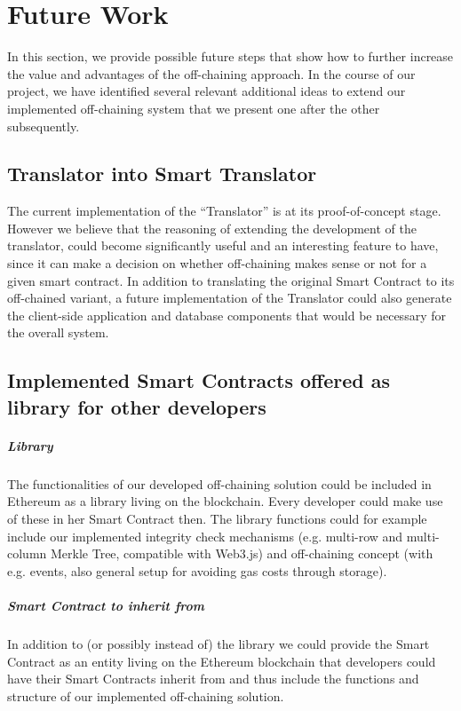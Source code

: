 \section{Future Work} \label{sec:future_work}

In this section, we provide possible future steps that show how to further increase the value and advantages of the off-chaining approach. In the course of our project, we have identified several relevant additional ideas to extend our implemented off-chaining system that we present one after the other subsequently.

\subsection{Translator into Smart Translator}
The current implementation of the “Translator” is at its proof-of-concept stage. However we believe that the reasoning of extending the development of the translator, could become significantly useful and an interesting feature to have, since it can make a decision on whether off-chaining makes sense or not for a given smart contract. In addition to translating the original Smart Contract to its off-chained variant, a future implementation of the Translator could also generate the client-side application and database components that would be necessary for the overall system.

\subsection{Implemented Smart Contracts offered as library for other developers}
\subparagraph{Library}
The functionalities of our developed off-chaining solution could be included in Ethereum as a library living on the blockchain. Every developer could make use of these in her Smart Contract then. The library functions could for example include our implemented integrity check mechanisms (e.g. multi-row and multi-column Merkle Tree, compatible with Web3.js) and off-chaining concept (with e.g. events, also general setup for avoiding gas costs through storage).

\subparagraph{Smart Contract to inherit from}
In addition to (or possibly instead of) the library we could provide the Smart Contract as an entity living on the Ethereum blockchain that developers could have their Smart Contracts inherit from and thus include the functions and structure of our implemented off-chaining solution.


